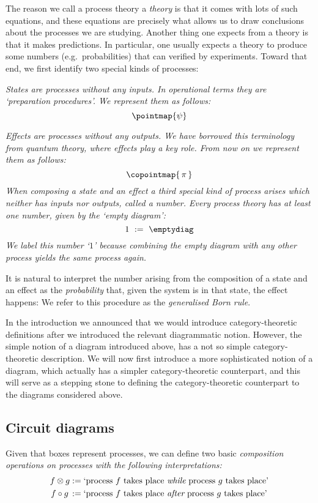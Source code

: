 \documentclass[12pt]{article}
\begin{document}
The reason we call a process theory a \textit{theory} is that it comes with lots of such equations, and these equations are precisely what allows us to draw conclusions about the processes we are studying.  Another thing one expects from a theory is that it makes predictions. In particular, one usually expects a theory to produce some numbers (e.g.~probabilities) that can verified by experiments. Toward that end, we first identify two special kinds of processes:
\bit
\item \em States \em are processes without any inputs. In  operational terms they are `preparation procedures'. We represent them as follows:
\[
\pointmap{\psi}
\]
\item
\em Effects \em are processes without any outputs. We have borrowed this terminology from quantum theory, where effects play a key role.  From now on we  represent them as follows:
\[
\copointmap{\,\pi\,} 
\]
\eit
When composing a state and an effect a third special kind of process arises which neither has inputs nor outputs, called a \em number\em.  Every process theory has at least one number, given by the `empty diagram':
\[ 
1 \ :=\ \emptydiag 
\]
We label this number `$1$' because combining the empty diagram with any other process yields the same process again.

It is natural to interpret the number arising from the composition of a state and an effect as the \textit{probability} that, given the system is in that state, the effect happens: 
We refer to this procedure as the \textit{generalised Born rule}.

In the introduction we announced that we would introduce category-theoretic definitions after we introduced the relevant diagrammatic notion.  However, the simple notion of a diagram introduced above, has a not so simple category-theoretic description.  We will now first introduce a more sophisticated notion of a diagram, which actually has a simpler category-theoretic counterpart, and this will serve as a stepping stone to defining the category-theoretic counterpart to the diagrams considered above.


\subsection{Circuit diagrams}

Given that  boxes represent  processes, we can define two basic \em composition operations \em on processes with the following interpretations:
\begin{align*}
  \textrm{$f \otimes g$}
  & := 
  \textrm{`process $f$ takes place {\em while} process $g$ takes place'} \\  
  \textrm{$f \circ g$\,}
  & :=
  \textrm{`process $f$ takes place {\em after} process $g$ takes place'}  
\end{align*}
\end{document}
